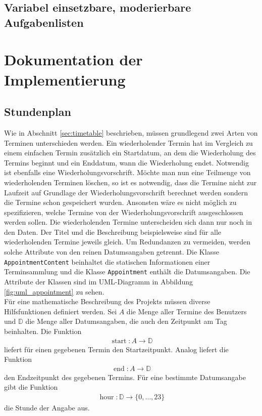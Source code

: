 \documentclass[noindent]{tudreport}
\DeclareMathOperator{\start}{start}
\DeclareMathOperator{\getEnd}{end}
\DeclareMathOperator{\hour}{hour}
\begin{document}
		\section{Variabel einsetzbare, moderierbare Aufgabenlisten}\label{sec:todo_list}
		
	\chapter{Dokumentation der Implementierung}\label{chap:documentation}
		\section{Stundenplan}
			Wie in Abschnitt \ref{sec:timetable} beschrieben, müssen grundlegend zwei Arten von Terminen unterschieden werden. Ein wiederholender Termin hat im Vergleich zu einem einfachen Termin zusätzlich ein Startdatum, an dem die Wiederholung des Termins beginnt und ein Enddatum, wann die Wiederholung endet. Notwendig ist ebenfalls eine Wiederholungsvorschrift. Möchte man nun eine Teilmenge von wiederholenden Terminen löschen, so ist es notwendig, dass die Termine nicht zur Laufzeit auf Grundlage der Wiederholungsvorschrift berechnet werden sondern die Termine schon gespeichert wurden. Ansonsten wäre es nicht möglich zu spezifizieren, welche Termine von der Wiederholungsvorschrift ausgeschlossen werden sollen. Die wiederholenden Termine unterscheiden sich dann nur noch in den Daten. Der Titel und die Beschreibung beispielsweise sind für alle wiederholenden Termine jeweils gleich. Um Redundanzen zu vermeiden, werden solche Attribute von den reinen Datumsangaben getrennt. Die Klasse \lstinline!AppointmentContent! beinhaltet die statischen Informationen einer Terminsammlung und die Klasse \lstinline!Appointment! enthält die Datumsangaben. Die Attribute der Klassen sind im UML-Diagramm in Abbildung \ref{fig:uml_appointment} zu sehen.\\
			Für eine mathematische Beschreibung des Projekts müssen diverse Hilfsfunktionen definiert werden. Sei $A$ die Menge aller Termine des Benutzers und $\mathbb{D}$ die Menge aller Datumsangaben, die auch den Zeitpunkt am Tag beinhalten. Die Funktion
			\begin{align}
\start: A \rightarrow \mathbb{D} \label{fun:start}
			\end{align}
			liefert für einen gegebenen Termin den Startzeitpunkt. Analog liefert die Funktion
			\begin{align}
\getEnd: A \rightarrow \mathbb{D} \label{fun:end}
			\end{align}
			den Endzeitpunkt des gegebenen Termins. Für eine bestimmte Datumsangabe gibt die Funktion
			\begin{align}
\hour: \mathbb{D} \rightarrow \{0, \dots, 23\} \label{fun:hour}
			\end{align}
			die Stunde der Angabe aus.
			
\end{document}
